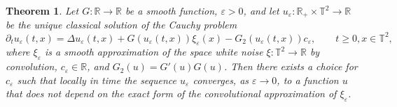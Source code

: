 \documentclass[a4paper, 11pt]{article}
\newtheorem{theorem}{Theorem}[section]
\begin{document}
\begin{theorem}
  Let $G : \mathbb{R} \rightarrow \mathbb{R}$ be a smooth function,
  $\varepsilon > 0$, and let $u_{\varepsilon} : \mathbb{R}_+ \times
  \mathbb{T}^2 \rightarrow \mathbb{R}$ be the unique classical solution of
  the Cauchy problem
  \[ \partial_t u_{\varepsilon} (t, x) = \Delta u_{\varepsilon} (t, x) + G
     (u_{\varepsilon} (t, x)) \xi_{\varepsilon} (x) - G_2 (u_{\varepsilon} (t,
     x)) c_{\varepsilon}, \qquad t \geqslant 0, x \in \mathbb{T}^2, \]
  where $\xi_{\varepsilon}$ is a smooth approximation of the space white noise
  $\xi : \mathbb{T}^2 \rightarrow \mathbb{R}$ by convolution,
  $c_{\varepsilon} \in \mathbb{R}$, and $G_2 (u) = G' (u) G (u)$. Then there
  exists a choice for $c_{\varepsilon}$ such that locally in time the sequence
  $u_{\varepsilon}$ converges, as $\varepsilon \rightarrow 0$, to a function
  $u$ that does not depend on the exact form of the convolutional
  approximation of $\xi_{\varepsilon}$.
\end{theorem}
\end{document}

